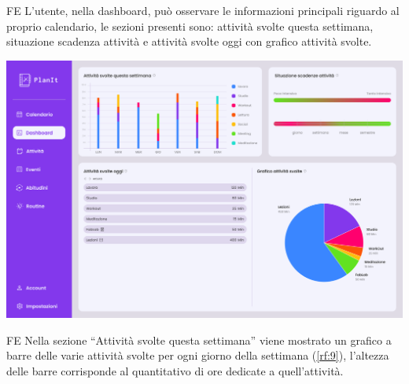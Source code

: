 \begin{listaPersonale}{FE}
    \pagebreak
     L’utente, nella dashboard, può osservare le informazioni principali riguardo al proprio calendario, le sezioni presenti sono: attività svolte questa settimana, situazione scadenza attività e attività svolte oggi con grafico attività svolte.
    \begin{center}
        \includegraphics[width=1\textwidth]{img/FrontEnd/Dashboard/Dashboard.png}
    \end{center}
    
    \begin{listaPersonale2}{FE}
         Nella sezione “Attività svolte questa settimana” viene mostrato un grafico a barre delle varie attività svolte per ogni giorno della settimana (\ref{rf:9}), l’altezza delle barre corrisponde al quantitativo di ore dedicate a quell’attività.


\end{listaPersonale2}
\end{listaPersonale}
